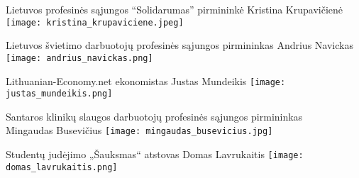 \documentclass[12pt]{letter}
\begin{document}
Lietuvos profesinės sąjungos “Solidarumas” pirmininkė Kristina Krupavičienė
\texttt{[image: kristina\_krupaviciene.jpeg]}

Lietuvos švietimo darbuotojų profesinės sąjungos pirmininkas Andrius Navickas
\texttt{[image: andrius\_navickas.png]}

Lithuanian-Economy.net ekonomistas Justas Mundeikis
\texttt{[image: justas\_mundeikis.png]}

Santaros klinikų slaugos darbuotojų profesinės sąjungos pirmininkas \\ \hspace*{1cm}Mingaudas Busevičius
\texttt{[image: mingaudas\_busevicius.jpg]}

Studentų judėjimo „Šauksmas“ atstovas Domas Lavrukaitis
\texttt{[image: domas\_lavrukaitis.png]}
\end{document}
